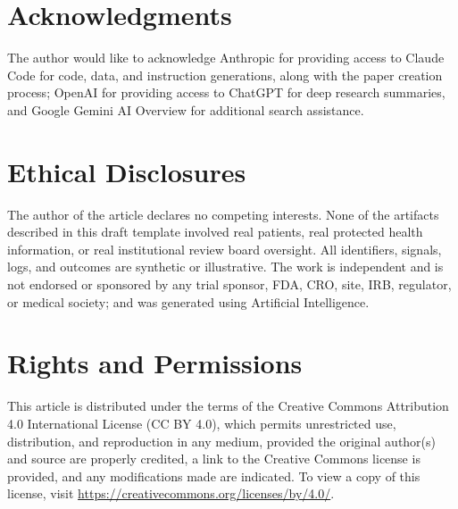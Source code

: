 %

{}
\section*{Acknowledgments}
\label{sec:acknowledgments}

The author would like to acknowledge Anthropic for providing access to
Claude Code for code, data, and instruction generations, along with
the paper creation process; OpenAI for providing access to ChatGPT
for deep research summaries, and Google Gemini AI Overview for
additional search assistance.

{}
\section*{Ethical Disclosures}
\label{sec:ethics}

The author of the article declares no competing interests. None of
the artifacts described in this draft template involved real
patients, real protected health information, or real institutional
review board oversight. All identifiers, signals, logs, and outcomes
are synthetic or illustrative. The work is independent and is not
endorsed or sponsored by any trial sponsor, FDA, CRO, site, IRB,
regulator, or medical society; and was generated using Artificial
Intelligence.

{}
\section*{Rights and Permissions}
\label{sec:rights}

This article is distributed under the terms of the Creative Commons
Attribution 4.0 International License (CC BY 4.0), which permits
unrestricted use, distribution, and reproduction in any medium,
provided the original author(s) and source are properly credited, a
link to the Creative Commons license is provided, and any
modifications made are indicated. To view a copy of this license,
visit \url{https://creativecommons.org/licenses/by/4.0/}.

